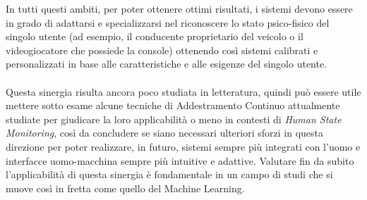In tutti questi ambiti, per poter ottenere ottimi risultati, i sistemi devono essere in grado di adattarsi e specializzarsi nel riconoscere lo stato psico-fisico del singolo utente (ad esempio, il conducente proprietario del veicolo o il videogiocatore che possiede la console) ottenendo così sistemi calibrati e personalizzati in base alle caratteristiche e alle esigenze del singolo utente.\\\\
Questa sinergia risulta ancora poco studiata in letteratura, quindi può essere utile mettere sotto esame alcune tecniche di Addestramento Continuo attualmente studiate per giudicare la loro applicabilità o meno in contesti di \textit{Human State Monitoring}, così da concludere se siano necessari ulteriori sforzi in questa direzione per poter realizzare, in futuro, sistemi sempre più integrati con l'uomo e interfacce uomo-macchina sempre più intuitive e adattive. Valutare fin da subito l'applicabilità di questa sinergia è fondamentale in un campo di studi che si muove così in fretta come quello del Machine Learning.

